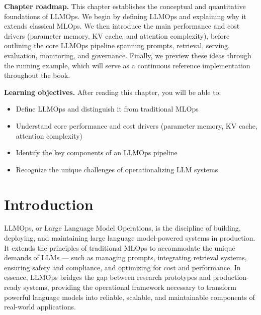 \begin{tcolorbox}[
  title={\textbf{Chapter Overview}},
  colback=blue!5,
  colframe=blue!40!black,
  colbacktitle=blue!20,
  coltitle=black,
  fonttitle=\bfseries,
  boxrule=0.7pt,
  arc=4pt,
  left=5mm, right=5mm, top=4mm, bottom=4mm
]
\noindent\textbf{Chapter roadmap.} This chapter establishes the conceptual and quantitative foundations of LLMOps.
We begin by defining LLMOps and explaining why it extends classical MLOps. We then
introduce the main performance and cost drivers (parameter memory, KV cache, and attention
complexity), before outlining the core LLMOps pipeline spanning prompts, retrieval, serving,
evaluation, monitoring, and governance. Finally, we preview these ideas through the \ishtar{}
running example, which will serve as a continuous reference implementation throughout the book.

\medskip
\noindent\textbf{Learning objectives.} After reading this chapter, you will be able to:
\begin{itemize}[leftmargin=1.5em, itemsep=3pt]
    \item Define LLMOps and distinguish it from traditional MLOps
    \item Understand core performance and cost drivers (parameter memory, KV cache, attention complexity)
    \item Identify the key components of an LLMOps pipeline
    \item Recognize the unique challenges of operationalizing LLM systems
\end{itemize}
\end{tcolorbox}


\section{Introduction}
\label{sec:ch2-introduction}

LLMOps, or Large Language Model Operations, is the discipline of building, deploying, and maintaining large language model-powered systems in production. It extends the principles of traditional MLOps to accommodate the unique demands of LLMs — such as managing prompts, integrating retrieval systems, ensuring safety and compliance, and optimizing for cost and performance. In essence, LLMOps bridges the gap between research prototypes and production-ready systems, providing the operational framework necessary to transform powerful language models into reliable, scalable, and maintainable components of real-world applications.

